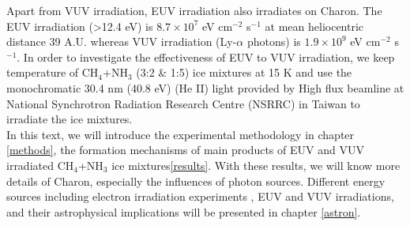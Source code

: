 Apart from VUV irradiation, EUV irradiation also irradiates on Charon. The EUV irradiation (>12.4 eV) is $8.7 \times 10^7$ eV cm$^{-2}$ s$^{-1}$ at mean heliocentric distance 39 A.U. whereas VUV irradiation (Ly-$\alpha$ photons) is $1.9 \times 10^9$ eV cm$^{-2}$ s$^{-1}$\cite{grundy2016formation}. In order to investigate the effectiveness of EUV to VUV irradiation, we keep temperature of CH$_4$+NH$_3$ (3:2 \& 1:5) ice mixtures at 15 K and use the monochromatic 30.4 nm (40.8 eV) (He II) light provided by High flux beamline at National Synchrotron Radiation Research Centre (NSRRC) in Taiwan to irradiate the ice mixtures.\\

In this text, we will introduce the experimental methodology in chapter \ref{methods}, the formation mechanisms of main products of  EUV and VUV irradiated CH$_4$+NH$_3$ ice mixtures\ref{results}. With these results, we will know more details of Charon, especially the influences of photon sources. Different energy sources including electron irradiation experiments , EUV and VUV irradiations, and their astrophysical implications will be presented in chapter \ref{astron}.\\
